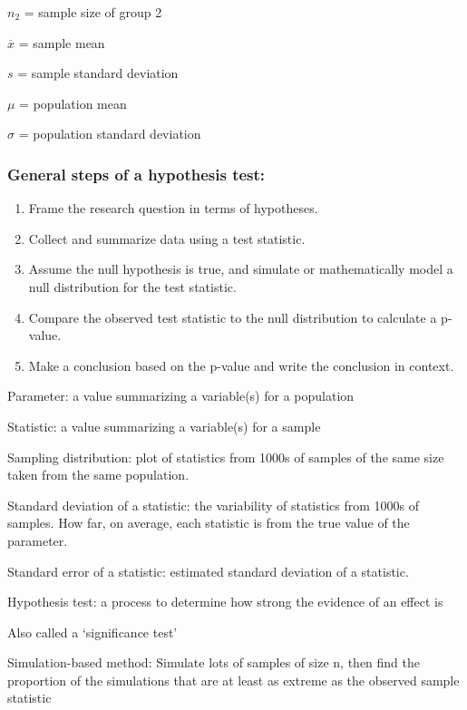 \documentclass[
]{report}
\newcommand{\rgi}{\hspace{24pt}}  %
\begin{document}
\(n_2\) = sample size of group 2

\(\overline{x}\) = sample mean

\(s\) = sample standard deviation

\(\mu\) = population mean

\(\sigma\) = population standard deviation

\hypertarget{general-steps-of-a-hypothesis-test-3}{%
\subsubsection*{General steps of a hypothesis test:}\label{general-steps-of-a-hypothesis-test-3}}

\begin{enumerate}
\def\labelenumi{\arabic{enumi}.}
\item
  Frame the research question in terms of hypotheses.
\item
  Collect and summarize data using a test statistic.
\item
  Assume the null hypothesis is true, and simulate or mathematically model a null distribution for the test statistic.
\item
  Compare the observed test statistic to the null distribution to calculate a p-value.
\item
  Make a conclusion based on the p-value and write the conclusion in context.
\end{enumerate}

Parameter: a value summarizing a variable(s) for a population

Statistic: a value summarizing a variable(s) for a sample

Sampling distribution: plot of statistics from 1000s of samples of the same size taken from the same population.

Standard deviation of a statistic: the variability of statistics from 1000s of samples. How far, on average, each statistic is from the true value of the parameter.

Standard error of a statistic: estimated standard deviation of a statistic.

Hypothesis test: a process to determine how strong the evidence of an effect is

\rgi Also called a `significance test'

Simulation-based method: Simulate lots of samples of size n, then find the proportion of the simulations that are at least as extreme as the observed sample statistic
\end{document}
